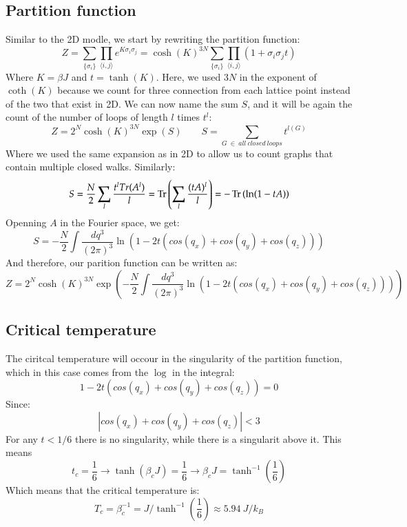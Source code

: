 \documentclass{article}
\begin{document}
\subsection{Partition function}
Similar to the 2D modle, we start by rewriting the partition function:
\begin{equation}
    Z = \sum_{\{\sigma_i\}}\prod_{\langle i, j \rangle}
        e^{K\sigma_i\sigma_j} = 
        \cosh(K)^{3N}\sum_{\{\sigma_i\}}\prod_{\langle i, j \rangle}
        (1 + \sigma_i\sigma_j t)
\end{equation}
Where $K = \beta J$ and $t = \tanh(K)$. Here, we used $3N$ in the exponent of $\coth(K)$ because we count for three connection from each lattice point instead of the two that exist in 2D.
\newline
We can now name the sum $S$, and it will be again the count of the number of loops of length $l$ times $t^l$:
\begin{equation}
    Z = 2^N \cosh(K)^{3N}\exp(S) \qquad S = \sum_{G \ \in \ all \ closed \ loops} t^{l(G)}
\end{equation}
Where we used the same expansion as in 2D to allow us to count graphs that contain multiple closed walks. Similarly:
\begin{equation}
    S = \frac{N}{2}\sum_l \frac{t^{l} Tr(A^l)}{l} = \Tr\left(
        \sum_l \frac{(tA)^{l}}{l}
    \right) = -\Tr\left(\ln(1-tA)\right)
\end{equation}
Openning $A$ in the Fourier space, we get:
\begin{equation}
    S = -\frac{N}{2} \int \frac{dq^3}{(2\pi)^3}\ln(1 - 2t(cos(q_x) + cos(q_y) + cos(q_z)))
\end{equation}
And therefore, our parition function can be written as:
\begin{equation}
    Z = 2^N \cosh(K)^{3N} \exp(-\frac{N}{2} \int \frac{dq^3}{(2\pi)^3}\ln(1 - 2t(cos(q_x) + cos(q_y) + cos(q_z))))
\end{equation}
\subsection{Critical temperature}
The ciritcal temperature will occour in the singularity of the partition function, which in this case comes from the $\log$ in the integral:
\begin{equation}
    1 - 2t(cos(q_x) + cos(q_y) + cos(q_z)) = 0
\end{equation}
Since:
\begin{equation}
    |cos(q_x) + cos(q_y) + cos(q_z)| < 3
\end{equation}
For any $t < 1/6$ there is no singularity, while there is a singularit above it. This means
\begin{equation}
    t_c = \frac{1}{6} \rightarrow \tanh(\beta_c J) = \frac{1}{6} \rightarrow \beta_c J = \tanh^{-1}\left(\frac{1}{6}\right)
\end{equation}
Which means that the critical temperature is:
\begin{equation}
    T_c = \beta_c^{-1} = J/\tanh^{-1}\left(\frac{1}{6}\right) \approx 5.94 \ J/k_B
\end{equation}
\end{document}
